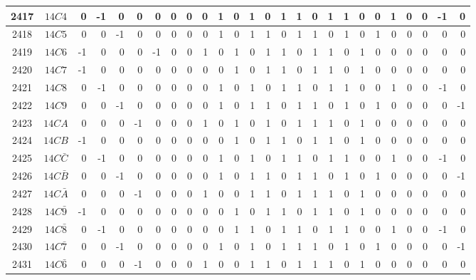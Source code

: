 \documentclass[12 pt]{article}%
\begin{document}
\begin{tiny}
\begin{centering}
\begin{longtable}{|c|c||rrrrrrrrrrrrrrrrrrrrrrrr|}
      \hline
      2417 & $14C4$ & 0 & -1 & 0 & 0 & 0 & 0 & 0 & 0 & 1 & 0 & 1 & 0 & 1 & 1 & 0 & 1 & 1 & 0 & 0 & 1 & 0 & 0 & -1 & 0 \\
      \hline
      2418 & $14C5$ & 0 & 0 & -1 & 0 & 0 & 0 & 0 & 0 & 1 & 0 & 1 & 1 & 0 & 1 & 1 & 0 & 1 & 0 & 1 & 0 & 0 & 0 & 0 & 0 \\
      \hline
      2419 & $14C6$ & -1 & 0 & 0 & 0 & -1 & 0 & 0 & 1 & 0 & 1 & 0 & 1 & 1 & 0 & 1 & 1 & 0 & 1 & 0 & 0 & 0 & 0 & 0 & 0 \\
      \hline
      2420 & $14C7$ & -1 & 0 & 0 & 0 & 0 & 0 & 0 & 0 & 0 & 1 & 0 & 1 & 1 & 0 & 1 & 1 & 0 & 1 & 0 & 0 & 0 & 0 & 0 & 0 \\
      \hline
      2421 & $14C8$ & 0 & -1 & 0 & 0 & 0 & 0 & 0 & 0 & 1 & 0 & 1 & 0 & 1 & 1 & 0 & 1 & 1 & 0 & 0 & 1 & 0 & 0 & -1 & 0 \\
      \hline
      2422 & $14C9$ & 0 & 0 & -1 & 0 & 0 & 0 & 0 & 0 & 1 & 0 & 1 & 1 & 0 & 1 & 1 & 0 & 1 & 0 & 1 & 0 & 0 & 0 & 0 & -1 \\
      \hline
      2423 & $14CA$ & 0 & 0 & 0 & -1 & 0 & 0 & 0 & 1 & 0 & 1 & 0 & 1 & 0 & 1 & 1 & 1 & 0 & 1 & 0 & 0 & 0 & 0 & 0 & 0 \\
      \hline
      2424 & $14CB$ & -1 & 0 & 0 & 0 & 0 & 0 & 0 & 0 & 0 & 1 & 0 & 1 & 1 & 0 & 1 & 1 & 0 & 1 & 0 & 0 & 0 & 0 & 0 & 0 \\
      \hline
      2425 & $14C\bar C$ & 0 & -1 & 0 & 0 & 0 & 0 & 0 & 0 & 1 & 0 & 1 & 0 & 1 & 1 & 0 & 1 & 1 & 0 & 0 & 1 & 0 & 0 & -1 & 0 \\
      \hline
      2426 & $14C\bar B$ & 0 & 0 & -1 & 0 & 0 & 0 & 0 & 0 & 1 & 0 & 1 & 1 & 0 & 1 & 1 & 0 & 1 & 0 & 1 & 0 & 0 & 0 & 0 & -1 \\
      \hline
      2427 & $14C\bar A$ & 0 & 0 & 0 & -1 & 0 & 0 & 0 & 1 & 0 & 0 & 1 & 1 & 0 & 1 & 1 & 1 & 0 & 1 & 0 & 0 & 0 & 0 & 0 & 0 \\
      \hline
      2428 & $14C\bar9$ & -1 & 0 & 0 & 0 & 0 & 0 & 0 & 0 & 0 & 1 & 0 & 1 & 1 & 0 & 1 & 1 & 0 & 1 & 0 & 0 & 0 & 0 & 0 & 0 \\
      \hline
      2429 & $14C\bar8$ & 0 & -1 & 0 & 0 & 0 & 0 & 0 & 0 & 0 & 1 & 1 & 0 & 1 & 1 & 0 & 1 & 1 & 0 & 0 & 1 & 0 & 0 & -1 & 0 \\
      \hline
      2430 & $14C\bar7$ & 0 & 0 & -1 & 0 & 0 & 0 & 0 & 0 & 1 & 0 & 1 & 0 & 1 & 1 & 1 & 0 & 1 & 0 & 1 & 0 & 0 & 0 & 0 & -1 \\
      \hline
      2431 & $14C\bar6$ & 0 & 0 & 0 & -1 & 0 & 0 & 0 & 1 & 0 & 0 & 1 & 1 & 0 & 1 & 1 & 1 & 0 & 1 & 0 & 0 & 0 & 0 & 0 & 0 \\

\end{longtable}
\end{centering}
\end{tiny}
\end{document}

